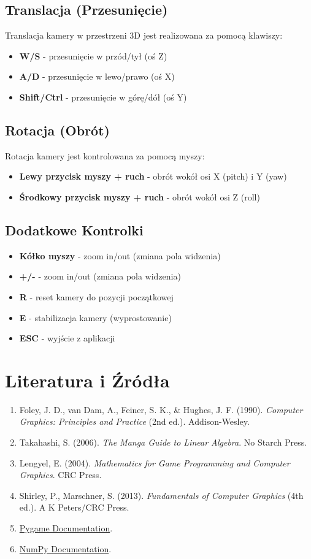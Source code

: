 \documentclass[a4paper,12pt]{article}
\begin{document}
\subsection{Translacja (Przesunięcie)}
Translacja kamery w przestrzeni 3D jest realizowana za pomocą klawiszy:
\begin{itemize}
    \item \textbf{W/S} - przesunięcie w przód/tył (oś Z)
    \item \textbf{A/D} - przesunięcie w lewo/prawo (oś X)
    \item \textbf{Shift/Ctrl} - przesunięcie w górę/dół (oś Y)
\end{itemize}

\subsection{Rotacja (Obrót)}
Rotacja kamery jest kontrolowana za pomocą myszy:
\begin{itemize}
    \item \textbf{Lewy przycisk myszy + ruch} - obrót wokół osi X (pitch) i Y (yaw)
    \item \textbf{Środkowy przycisk myszy + ruch} - obrót wokół osi Z (roll)
\end{itemize}

\subsection{Dodatkowe Kontrolki}
\begin{itemize}
    \item \textbf{Kółko myszy} - zoom in/out (zmiana pola widzenia)
    \item \textbf{+/-} - zoom in/out (zmiana pola widzenia)
    \item \textbf{R} - reset kamery do pozycji początkowej
    \item \textbf{E} - stabilizacja kamery (wyprostowanie)
    \item \textbf{ESC} - wyjście z aplikacji
\end{itemize}

\section{Literatura i Źródła}
\begin{enumerate}
    \item Foley, J. D., van Dam, A., Feiner, S. K., \& Hughes, J. F. (1990). \textit{Computer Graphics: Principles and Practice} (2nd ed.). Addison-Wesley.
    \item Takahashi, S. (2006). \textit{The Manga Guide to Linear Algebra}. No Starch Press.
    \item Lengyel, E. (2004). \textit{Mathematics for Game Programming and Computer Graphics}. CRC Press.
    \item Shirley, P., Marschner, S. (2013). \textit{Fundamentals of Computer Graphics} (4th ed.). A K Peters/CRC Press.
    \item \href{https://www.pygame.org/docs/}{Pygame Documentation}.
    \item \href{https://numpy.org/doc/}{NumPy Documentation}.
\end{enumerate}
\end{document}
